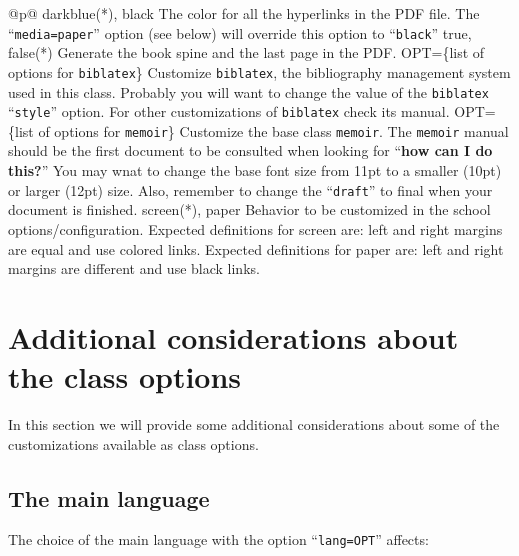 \begin{ctabular}{@{}p{\linewidth}@{}}
    \midrule
    {darkblue(*), black}%
    {The color for all the hyperlinks in the PDF file.  The “\texttt{media=paper}” option (see below) will override this option to “\texttt{black}”}
    \midrule
    {true, false(*)}%
    {Generate the book spine and the last page in the PDF.}
    \midrule
    {OPT=\{list of options for \texttt{biblatex}\}}%
    {Customize \texttt{biblatex}, the bibliography management system used in this class. Probably you will want to change the value of the \texttt{biblatex} “\texttt{style}” option. For other customizations of \texttt{biblatex} check its manual.}
    \midrule
    {OPT=\{list of options for \texttt{memoir}\}}%
    {Customize the base class \texttt{memoir}. The \texttt{memoir} manual should be the first document to be consulted when looking for “\textbf{how can I do this?}” You may wnat to change the base font size from 11pt to a smaller (10pt) or larger (12pt) size.  Also, remember to change the “\texttt{draft}” to final when your document is finished.}
    \midrule
    {screen(*), paper}%
    {Behavior to be customized in the school options/configuration. Expected definitions for screen are: left and right margins are equal and use colored links. Expected definitions for paper are: left and right margins are different and use black links.}
    \bottomrule
\end{ctabular}

\section{Additional considerations about the class options} %
\label{sec:additional_considerations}

In this section we will provide some additional considerations about some of the customizations available as class options.

\subsection{The main language} %
\label{sub:the_main_language}

The choice of the main language with the option “\texttt{lang=OPT}” affects:

